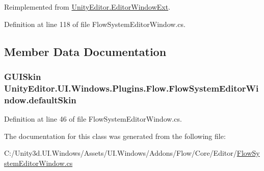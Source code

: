 Reimplemented from \hyperlink{class_unity_editor_1_1_editor_window_ext_aaa95c1215e9d733e51018f7bc545da1b}{Unity\+Editor.\+Editor\+Window\+Ext}.



Definition at line 118 of file Flow\+System\+Editor\+Window.\+cs.



\subsection{Member Data Documentation}
\hypertarget{class_unity_editor_1_1_u_i_1_1_windows_1_1_plugins_1_1_flow_1_1_flow_system_editor_window_a3ec228cb183cd40aa8664a1f78b0accb}{}
\subsubsection[{default\+Skin}]{\setlength{\rightskip}{0pt plus 5cm}G\+U\+I\+Skin Unity\+Editor.\+U\+I.\+Windows.\+Plugins.\+Flow.\+Flow\+System\+Editor\+Window.\+default\+Skin\hspace{0.3cm}{\ttfamily [static]}}\label{class_unity_editor_1_1_u_i_1_1_windows_1_1_plugins_1_1_flow_1_1_flow_system_editor_window_a3ec228cb183cd40aa8664a1f78b0accb}


Definition at line 46 of file Flow\+System\+Editor\+Window.\+cs.



The documentation for this class was generated from the following file\+:\begin{DoxyCompactItemize}
\item 
C\+:/\+Unity3d.\+U\+I.\+Windows/\+Assets/\+U\+I.\+Windows/\+Addons/\+Flow/\+Core/\+Editor/\hyperlink{_flow_system_editor_window_8cs}{Flow\+System\+Editor\+Window.\+cs}\end{DoxyCompactItemize}
